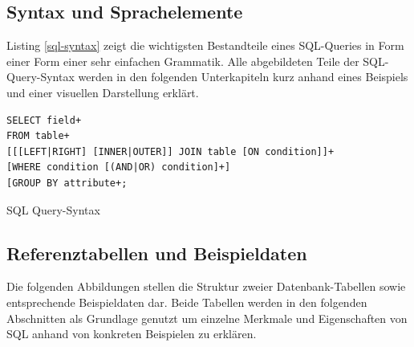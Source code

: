 \documentclass[a4paper]{article}
\begin{document}
\subsection{Syntax und Sprachelemente}
Listing \ref{sql-syntax} zeigt die wichtigsten Bestandteile eines SQL-Queries in Form einer Form einer sehr einfachen Grammatik. Alle abgebildeten Teile der SQL-Query-Syntax werden in den folgenden Unterkapiteln kurz anhand eines Beispiels und einer visuellen Darstellung erklärt.

\begin{listing}[H]
\begin{verbatim}
SELECT field+
FROM table+
[[[LEFT|RIGHT] [INNER|OUTER]] JOIN table [ON condition]]+
[WHERE condition [(AND|OR) condition]+]
[GROUP BY attribute+;
\end{verbatim}
\caption{SQL Query-Syntax}
\label{sql-syntax}
\end{listing}

\subsection{Referenztabellen und Beispieldaten}
Die folgenden Abbildungen stellen die Struktur zweier Datenbank-Tabellen sowie entsprechende Beispieldaten dar. Beide Tabellen werden in den folgenden Abschnitten als Grundlage genutzt um einzelne Merkmale und Eigenschaften von SQL anhand von konkreten Beispielen zu erklären.

\begin{table}[H]
\centering
{}
\caption{Beispiel-Tabellen}
\label{example}
\end{table}
\end{document}
